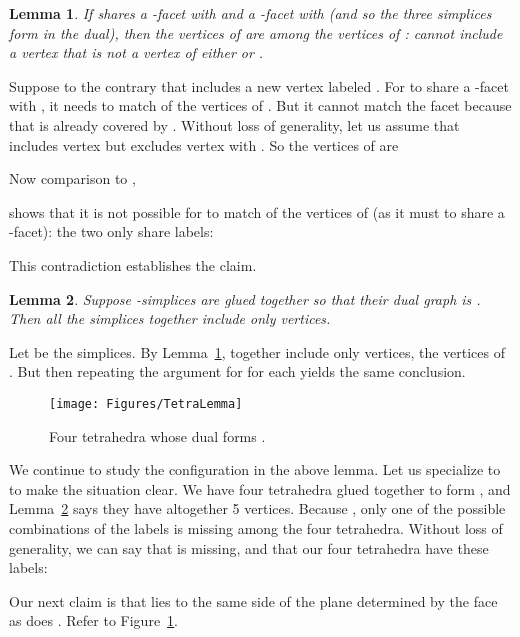 \pdfoutput=1  \documentclass[]{article}
\newcommand{\ABox}{
\raisebox{3pt}{\framebox[6pt]{\rule{6pt}{0pt}}}
}
\newenvironment{proof}{{\bf Proof:}}{\hfill\ABox}
\newtheorem{lemma}{Lemma}
\newcommand{\lemlab}[1]{\label{lemma:#1}}
\newcommand{\figlab}[1]{\label{fig:#1}}
\newcommand{\lemref}[1]{\ref{lemma:#1}}
\newcommand{\figref}[1]{\ref{fig:#1}}
\begin{document}
\begin{lemma}
If  shares a -facet with  and 
a -facet
with  (and so the three simplices form  in the dual),
then the  vertices of  are among the  vertices
of :
 cannot include a vertex that is not a vertex of 
either  or .
\lemlab{K3.d2}
\end{lemma}
\begin{proof}
Suppose to the contrary that  includes a new vertex labeled .
For  to share a -facet with ,
it needs to match  of the  vertices of .
But it cannot match the facet  because
that is already covered by .
Without loss of generality, let us assume that  includes
vertex  but excludes vertex  with .
So the  vertices of  are

Now comparison to ,

shows that it is not possible for  to match  of the 
vertices of  (as it must to share a -facet):
the two only share  labels: 

This contradiction establishes the claim.
\end{proof}

\begin{lemma}
Suppose  -simplices are glued together so that their dual
graph is .
Then all the simplices together include only  vertices.
\lemlab{Kd1.d2}
\end{lemma}
\begin{proof}
Let  be the simplices. 
By Lemma~\lemref{K3.d2},  together include only 
vertices,
the  vertices of .
But then repeating the argument for  for each 
yields the same conclusion.
\end{proof}

\begin{figure}[htbp]
\centering
\texttt{[image: Figures/TetraLemma]}
\caption{Four tetrahedra whose dual forms .}
\figlab{TetraLemma}
\end{figure}



We continue to study the  configuration in the above
lemma.  Let us specialize to  to make the situation clear.
We have four tetrahedra glued together to form ,
and Lemma~\lemref{Kd1.d2} says they have altogether 5 vertices.
Because , only one of the possible combinations
of the labels  is missing among the four tetrahedra.
Without loss of generality, we can say that  is missing,
and that our four tetrahedra have these labels:






Our next claim is that  lies to the same
side of the plane determined by the face  as does .
Refer to Figure~\figref{TetraLemma}.
\end{document}
